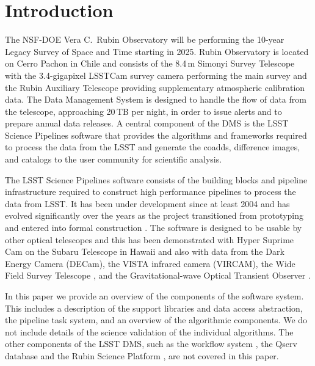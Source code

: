 \section{Introduction}
\label{sec:intro}

The NSF-DOE Vera C.\ Rubin Observatory will be performing the 10-year Legacy Survey of Space and Time \citep[LSST;][]{2019ApJ...873..111I} starting in 2025.
Rubin Observatory is located on Cerro Pachon in Chile and consists of the 8.4\,m Simonyi Survey Telescope with the 3.4-gigapixel LSSTCam survey camera performing the main survey and the Rubin Auxiliary Telescope providing supplementary atmospheric calibration data.
The Data Management System \citep[DMS;][]{2022arXiv221113611O} is designed to handle the flow of data from the telescope, approaching 20\,TB per night, in order to issue alerts and to prepare annual data releases.
A central component of the DMS is the LSST Science Pipelines software that provides the algorithms and frameworks required to process the data from the LSST and generate the coadds, difference images, and catalogs to the user community for scientific analysis.

The LSST Science Pipelines software consists of the building blocks and pipeline infrastructure required to construct high performance pipelines to process the data from LSST.
It has been under development since at least 2004 \citep{2004AAS...20510811A} and has evolved significantly over the years as the project transitioned from prototyping \citep{2010SPIE.7740E..15A} and entered into formal construction \citep{2017ASPC..512..279J}.
The software is designed to be usable by other optical telescopes and this has been demonstrated with Hyper Suprime Cam on the Subaru Telescope in Hawaii \citep{2018PASJ...70S...5B} and also with data from the Dark Energy Camera (DECam),  the VISTA infrared camera (VIRCAM), the Wide Field Survey Telescope \citep[WFST;][]{2025arXiv250115018C}, and the Gravitational-wave Optical Transient Observer \citep[GOTO;][]{2021PASA...38....4M}.

In this paper we provide an overview of the components of the software system.
This includes a description of the support libraries and data access abstraction, the pipeline task system, and an overview of the algorithmic components.
We do not include details of the science validation of the individual algorithms.
The other components of the LSST DMS, such as the workflow system \citep{2022arXiv221115795G}, the Qserv database \citep{Wang:2011:QDS:2063348.2063364} and the Rubin Science Platform \citep{LSE-319}, are not covered in this paper.
